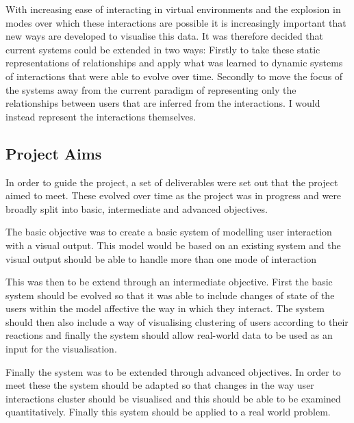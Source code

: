 \documentclass[12pt,a4paper]{article}
\begin{document}
With increasing ease of interacting in virtual environments and the explosion in modes over which these interactions are possible it is increasingly important that new ways are developed to visualise this data. It was therefore decided that current systems could be extended in two ways: Firstly to take these static representations of relationships and apply what was learned to dynamic systems of interactions that were able to evolve over time. Secondly to move the focus of the systems away from the current paradigm of representing only the relationships between users that are inferred from the interactions. I would instead represent the interactions themselves.

\subsection{Project Aims}
\noindent
In order to guide the project, a set of deliverables were set out that the project aimed to meet. These evolved over time as the project was in progress and were broadly split into basic, intermediate and advanced objectives.

The basic objective was to create a basic system of modelling user interaction with a visual output. This model would be based on an existing system and the visual output should be able to handle more than one mode of interaction

This was then to be extend through an intermediate objective. First the basic system should be evolved so that it was able to include changes of state of the users within the model affective the way in which they interact. The system should then also include a way of visualising clustering of users according to their reactions and finally the system should allow real-world data to be used as an input for the visualisation.

Finally the system was to be extended through advanced objectives. In order to meet these the system should be adapted so that changes in the way user interactions cluster should be visualised and this should be able to be examined quantitatively. Finally this system should be applied to a real world problem.
\end{document}
